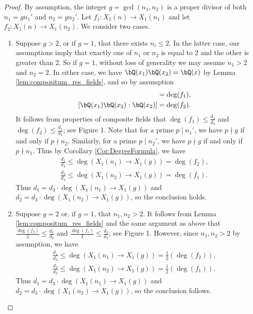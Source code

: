 \documentclass[11pt,reqno]{amsart}
\theoremstyle{plain}
\theoremstyle{definition}
\newcommand{\Q}{\bQ}
\begin{document}
    \begin{proof}  By assumption, the integer $g=\gcd(n_1,n_2)$ is a proper divisor of both $n_1=gn_1'$ and $n_2=gn_2'$. Let $f_1 \colon X_1(n) \rightarrow X_1(n_1)$ and let $f_2 \colon X_1(n) \rightarrow X_1(n_2)$. We consider two cases.
    \begin{enumerate}
    \item Suppose $ g>2$, or if $g=1$, that there exists $n_i \leq 2$. In the latter case, our assumptions imply that exactly one of $n_1$ or $n_2$ is equal to 2 and the other is greater than 2. So if $g=1$, without loss of generality we may assume $n_1>2$ and $n_2=2$. In either case, we have $\Q(x_1)\Q(x_2)=\Q(x)$ by Lemma \ref{lem:compositum_res_fields}, and so by assumption
    \begin{align*}
    [\Q(x_1)\Q(x_2):\Q(x_1)]=\deg(f_1),\\
    [\Q(x_1)\Q(x_2):\Q(x_2)]=\deg(f_2).
    \end{align*}
        It follows from properties of composite fields that $\deg(f_1) \leq \frac{d_2}{d_3}$ and $\deg(f_2) \leq \frac{d_1}{d_3}$; see Figure 1. Note that for a prime $p \mid n_1'$, we have $p \nmid g$ if and only if $p \nmid n_2$. Similarly, for a prime $p \mid n_2'$, we have $p \nmid g$ if and only if $p \nmid n_1$. Thus by Corollary \ref{Cor:DegreeFormula}, we have
    \begin{align*}
    \frac{d_1}{d_3} \leq \deg(X_1(n_1) \rightarrow X_1(g))=\deg(f_2),\\
        \frac{d_2}{d_3} \leq \deg(X_1(n_2) \rightarrow X_1(g))=\deg(f_1).
    \end{align*}
    Thus  $d_1=d_3\cdot \deg(X_1(n_1) \rightarrow X_1(g))$ and $d_2=d_3 \cdot \deg(X_1(n_2) \rightarrow X_1(g))$, so the conclusion holds.
    \item Suppose $g=2$ or, if $g=1$, that $n_1,n_2>2$. It follows from Lemma \ref{lem:compositum_res_fields} and the same argument as above that $\frac{\deg(f_2)}{2} \leq \frac{d_1}{d_3}$ and $\frac{\deg(f_1)}{2} \leq \frac{d_2}{d_3}$; see Figure 1. However, since $n_1,n_2>2$ by assumption, we have
    \begin{align*}
    \frac{d_1}{d_3} \leq \deg(X_1(n_1) \rightarrow X_1(g))=\frac{1}{2}(\deg(f_2)),\\
       \frac{ d_2}{d_3} \leq \deg(X_1(n_2) \rightarrow X_1(g))=\frac{1}{2}(\deg(f_1)).
    \end{align*}
   Thus $d_1=d_3 \cdot \deg(X_1(n_1) \rightarrow X_1(g))$ and $d_2=d_3 \cdot \deg(X_1(n_2) \rightarrow X_1(g))$, so the conclusion follows. \qedhere
      \end{enumerate}
    \end{proof}
\end{document}
